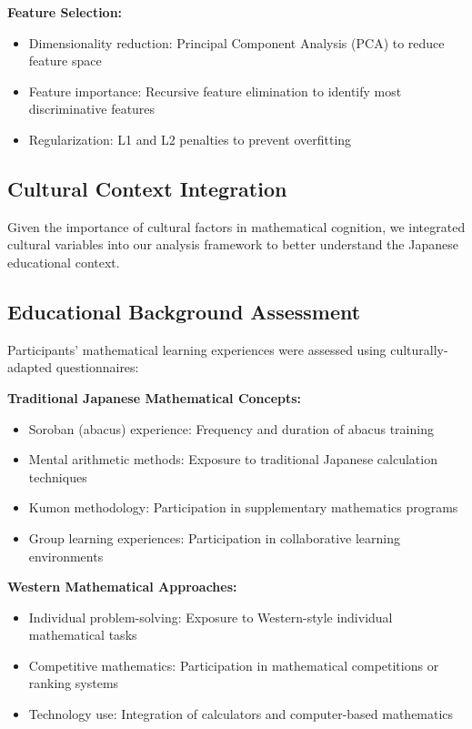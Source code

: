 \noindent
\textbf{Feature Selection:}
\begin{itemize}
\item Dimensionality reduction: Principal Component Analysis (PCA) to reduce feature space
\item Feature importance: Recursive feature elimination to identify most discriminative features
\item Regularization: L1 and L2 penalties to prevent overfitting
\end{itemize}


\subsection{Cultural Context Integration}
Given the importance of cultural factors in mathematical cognition, we integrated cultural variables into our analysis framework to better understand the Japanese educational context.

\subsection{Educational Background Assessment}
Participants' mathematical learning experiences were assessed using culturally-adapted questionnaires:

\vspace{0.5\baselineskip}
\noindent
\textbf{Traditional Japanese Mathematical Concepts:}
\begin{itemize}
\item Soroban (abacus) experience: Frequency and duration of abacus training
\item Mental arithmetic methods: Exposure to traditional Japanese calculation techniques
\item Kumon methodology: Participation in supplementary mathematics programs
\item Group learning experiences: Participation in collaborative learning environments
\end{itemize}

\noindent
\textbf{Western Mathematical Approaches:}
\begin{itemize}
\item Individual problem-solving: Exposure to Western-style individual mathematical tasks
\item Competitive mathematics: Participation in mathematical competitions or ranking systems
\item Technology use: Integration of calculators and computer-based mathematics
\end{itemize}

